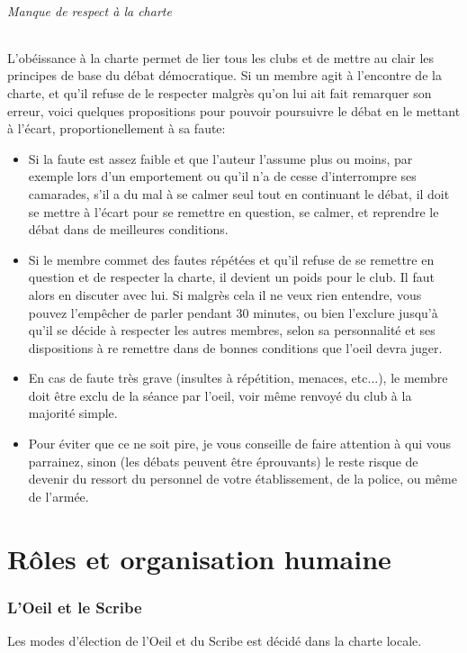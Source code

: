 \documentclass[a4paper,12pt]{article}
\begin{document}
\paragraph{Manque de respect à la charte}
L'obéissance à la charte permet de lier tous les clubs et de mettre au clair les principes de base du débat démocratique. Si un membre agit à l'encontre de la charte, et qu'il refuse de le respecter malgrès qu'on lui ait fait remarquer son erreur, voici quelques propositions pour pouvoir poursuivre le débat en le mettant à l'écart, proportionellement à sa faute:
\begin{itemize}
  \item Si la faute est assez faible et que l'auteur l'assume plus ou moins, par exemple lors d'un emportement ou qu'il n'a de cesse d'interrompre ses camarades, s'il a du mal à se calmer seul tout en continuant le débat, il doit se mettre à l'écart pour se remettre en question, se calmer, et reprendre le débat dans de meilleures conditions.
  \item Si le membre commet des fautes répétées et qu'il refuse de se remettre en question et de respecter la charte, il devient un poids pour le club. Il faut alors en discuter avec lui. Si malgrès cela il ne veux rien entendre, vous pouvez l'empêcher de parler pendant 30 minutes, ou bien l'exclure jusqu'à qu'il se décide à respecter les autres membres, selon sa personnalité et ses dispositions à re remettre dans de bonnes conditions que l'oeil devra juger.
  \item En cas de faute très grave (insultes à répétition, menaces, etc...), le membre doit être exclu de la séance par l'oeil, voir même renvoyé du club à la majorité simple.
  \item Pour éviter que ce ne soit pire, je vous conseille de faire attention à qui vous parrainez, sinon (les débats peuvent être éprouvants) le reste risque de devenir du ressort du personnel de votre établissement, de la police, ou même de l'armée.
\end{itemize}


\newpage
\part{Rôles et organisation humaine}
\section{L'Oeil et le Scribe}
Les modes d'élection de l'Oeil et du Scribe est décidé dans la charte locale.
\end{document}
